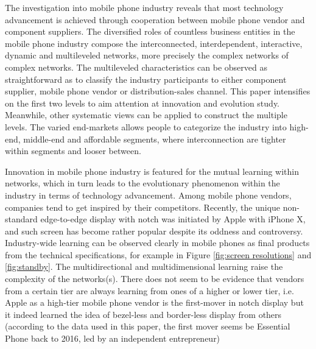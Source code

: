 \documentclass[utf8,english]{gradu3}
\begin{document}
The investigation into mobile phone industry reveals that most technology advancement is achieved through cooperation between mobile phone vendor and component suppliers. The diversified roles of countless business entities in the mobile phone industry compose the interconnected, interdependent, interactive, dynamic and multileveled networks, more precisely the complex networks of complex networks. The multileveled characteristics can be observed as straightforward as to classify the industry participants to either component supplier, mobile phone vendor or distribution-sales channel. This paper intensifies on the first two levels to aim attention at innovation and evolution study. Meanwhile, other systematic views can be applied to construct the multiple levels. The varied end-markets allows people to categorize the industry into high-end, middle-end and affordable segments, where interconnection are tighter within segments and looser between.

Innovation in mobile phone industry is featured for the mutual learning within networks, which in turn leads to the evolutionary phenomenon within the industry in terms of technology advancement. Among mobile phone vendors, companies tend to get inspired by their competitors. Recently, the unique non-standard edge-to-edge display with notch was initiated by Apple with iPhone X, and such screen has become rather popular despite its oddness and controversy. Industry-wide learning can be observed clearly in mobile phones as final products from the technical specifications, for example in Figure \ref{fig:screen resolutions} and \ref{fig:standby}. The multidirectional and multidimensional learning raise the complexity of the networks(s). There does not seem to be evidence that vendors from a certain tier are always learning from ones of a higher or lower tier, i.e. Apple as a high-tier mobile phone vendor is the first-mover in notch display but it indeed learned the idea of bezel-less and border-less display from others (according to the data used in this paper, the first mover seems be Essential Phone back to 2016, led by an independent entrepreneur)
\end{document}
